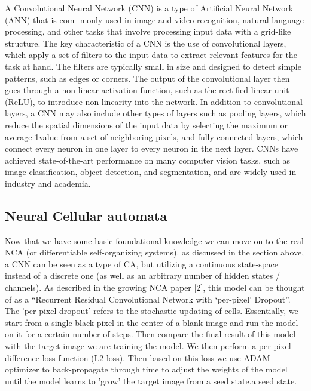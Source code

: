 A Convolutional Neural Network (CNN) is a type of Artificial Neural Network (ANN) that is com-
monly used in image and video recognition, natural language processing, and other tasks that involve
processing input data with a grid-like structure.
The key characteristic of a CNN is the use of convolutional layers, which apply a set of filters to
the input data to extract relevant features for the task at hand. The filters are typically small in size
and designed to detect simple patterns, such as edges or corners. The output of the convolutional
layer then goes through a non-linear activation function, such as the rectified linear unit (ReLU), to
introduce non-linearity into the network.
In addition to convolutional layers, a CNN may also include other types of layers such as pooling
layers, which reduce the spatial dimensions of the input data by selecting the maximum or average
1value from a set of neighboring pixels, and fully connected layers, which connect every neuron in one
layer to every neuron in the next layer.
CNNs have achieved state-of-the-art performance on many computer vision tasks, such as image
classification, object detection, and segmentation, and are widely used in industry and academia.

\subsection{Neural Cellular automata}

Now that we have some basic foundational knowledge we can move on to the real NCA (or differentiable
self-organizing systems). as discussed in the section above, a CNN can be seen as a type of CA, but
utilizing a continuous state-space instead of a discrete one (as well as an arbitrary number of hidden
states / channels). As described in the growing NCA paper [2], this model can be thought of as a
“Recurrent Residual Convolutional Network with ‘per-pixel’ Dropout”. The ’per-pixel dropout’ refers
to the stochastic updating of cells. Essentially, we start from a single black pixel in the center of a
blank image and run the model on it for a certain number of steps. Then compare the final result of
this model with the target image we are training the model. We then perform a per-pixel difference
loss function (L2 loss). Then based on this loss we use ADAM optimizer to back-propagate through
time to adjust the weights of the model until the model learns to ’grow’ the target image from a seed
state.a seed state.
